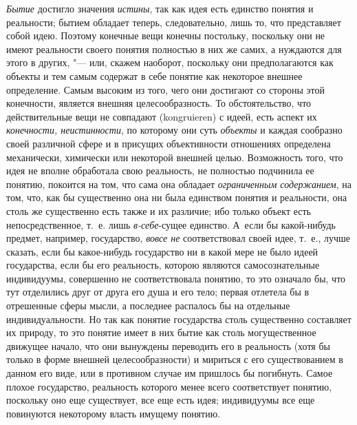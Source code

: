 {{{\em Бытие} достигло
значения {\em истины},
так как идея есть единство понятия и реальности; бытием
обладает теперь, следовательно, лишь то, что представляет собой идею.
Поэтому конечные вещи конечны постольку, поскольку они не имеют реальности
своего понятия полностью в них же самих, а нуждаются для этого в других, "---
или, скажем наоборот, поскольку они предполагаются как
объекты и тем самым содержат в себе понятие как некоторое внешнее
определение. Самым высоким из того, чего они достигают со стороны этой
конечности, является внешняя целесообразность. То обстоятельство, что
действительные вещи не совпадают (kongruieren) с идеей, есть
аспект их {\em конечности,
неистинности}, по которому они суть
{\em объекты} и каждая
сообразно своей различной сфере и в присущих объективности отношениях
определена механически, химически или некоторой внешней целью. Возможность
того, что идея не вполне обработала свою реальность, не полностью подчинила
ее понятию, покоится на том, что сама она обладает
{\em ограниченным содержанием},
на том, что, как бы существенно она ни была единством понятия
и реальности, она столь же существенно есть также и их различие; ибо
только объект есть непосредственное, т.~е. лишь
{\em в-себе}{}-сущее
единство. А~если бы какой-нибудь предмет, например, государство,
{\em вовсе не}
соответствовал своей идее, т.~е., лучше сказать, если бы
какое-нибудь государство ни в какой мере не было идеей государства, если бы
его реальность, которою являются самосознательные индивидуумы, совершенно
не соответствовала понятию, то это означало бы, что тут отделились друг от
друга его душа и его тело; первая отлетела бы в отрешенные сферы мысли, а
последнее распалось бы на отдельные индивидуальности. Но так как понятие
государства столь существенно составляет их природу, то это понятие имеет в
них бытие как столь могущественное движущее начало, что они вынуждены
переводить его в реальность (хотя бы только в форме внешней
целесообразности) и мириться с его существованием в данном его виде, или в
противном случае им пришлось бы погибнуть. Самое плохое государство,
реальность которого менее всего соответствует понятию, поскольку оно еще
существует, все еще есть идея; индивидуумы все еще повинуются некоторому
власть имущему понятию.

}}
